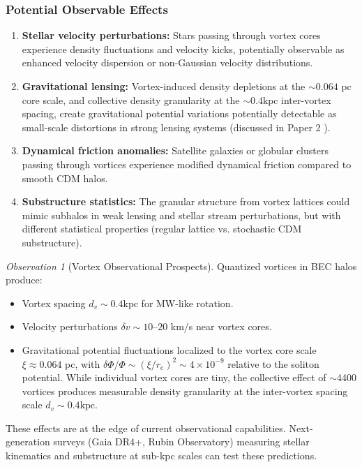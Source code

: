 \documentclass[11pt,a4paper]{article}
\newcommand{\kpc}{\ensuremath{\mathrm{kpc}}}
\newcommand{\rc}{\ensuremath{r_{\mathrm{c}}}}
\theoremstyle{definition}
\theoremstyle{remark}
\newtheorem{observation}{Observation}[section]
\begin{document}
\subsubsection{Potential Observable Effects}

\begin{enumerate}[leftmargin=*]
\item \textbf{Stellar velocity perturbations:} Stars passing through vortex cores experience density fluctuations and velocity kicks, potentially observable as enhanced velocity dispersion or non-Gaussian velocity distributions.

\item \textbf{Gravitational lensing:} Vortex-induced density depletions at the $\sim 0.064$ pc core scale, and collective density granularity at the $\sim 0.4 \kpc$ inter-vortex spacing, create gravitational potential variations potentially detectable as small-scale distortions in strong lensing systems (discussed in Paper 2 \cite{Paper2}).

\item \textbf{Dynamical friction anomalies:} Satellite galaxies or globular clusters passing through vortices experience modified dynamical friction compared to smooth CDM halos.

\item \textbf{Substructure statistics:} The granular structure from vortex lattices could mimic subhalos in weak lensing and stellar stream perturbations, but with different statistical properties (regular lattice vs. stochastic CDM substructure).
\end{enumerate}

\begin{observation}[Vortex Observational Prospects]
Quantized vortices in BEC halos produce:
\begin{itemize}[leftmargin=*]
\item Vortex spacing $d_v \sim 0.4 \kpc$ for MW-like rotation.
\item Velocity perturbations $\delta v \sim 10$--$20$ km/s near vortex cores.
\item Gravitational potential fluctuations localized to the vortex core scale $\xi \approx 0.064$ pc, with $\delta\Phi/\Phi \sim (\xi/\rc)^2 \sim 4 \times 10^{-9}$ relative to the soliton potential.  While individual vortex cores are tiny, the collective effect of $\sim$4400 vortices produces measurable density granularity at the inter-vortex spacing scale $d_v \sim 0.4 \kpc$.
\end{itemize}

These effects are at the edge of current observational capabilities. Next-generation surveys (Gaia DR4+, Rubin Observatory) measuring stellar kinematics and substructure at sub-kpc scales can test these predictions.
\end{observation}
\end{document}
